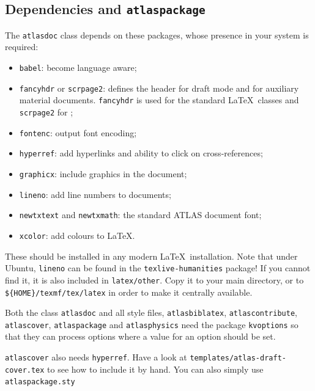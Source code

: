 \documentclass[UKenglish]{latex/atlasdoc}
\newcommand{\File}[1]{\texttt{#1}\xspace}
\newcommand{\Package}[1]{\texttt{#1}\xspace}
\begin{document}
\subsection{Dependencies and \Package{atlaspackage}}
\label{sec:atlaspackage}

The \Package{atlasdoc} class depends on these packages, whose presence in
your system is required:
\begin{itemize}\setlength{\parskip}{0pt}\setlength{\itemsep}{0pt}
\item \Package{babel}: become language aware;
\item \Package{fancyhdr} or \Package{scrpage2}: defines the header for draft mode
  and for auxiliary material documents.
  \Package{fancyhdr} is used for the standard \LaTeX\ classes and
  \Package{scrpage2} for \KOMAScript;
\item \Package{fontenc}: output font encoding;
\item \Package{hyperref}: add hyperlinks and ability to click on cross-references;
\item \Package{graphicx}: include graphics in the document;
\item \Package{lineno}: add line numbers to documents;
\item \Package{newtxtext} and \Package{newtxmath}: the standard ATLAS document font;
\item \Package{xcolor}: add colours to \LaTeX.
\end{itemize}
These should be installed in any modern \LaTeX\ installation.
Note that under Ubuntu, \Package{lineno} can be found in the
\Package{texlive-humanities} package!
If you cannot find it, it is also included in \File{latex/other}.
Copy it to your main directory, or to \verb|${HOME}/texmf/tex/latex| in order to make
it centrally available.

Both the class \Package{atlasdoc} and all style files, 
\Package{atlasbiblatex}, \Package{atlascontribute}, \Package{atlascover}, \Package{atlaspackage} and \Package{atlasphysics}
need the package \Package{kvoptions} 
so that they can process options where a value for an option should be set.

\texttt{atlascover} also needs \texttt{hyperref}. 
Have a look at \texttt{templates/atlas-draft-cover.tex} to see how to include it by hand.
You can also simply use \texttt{atlaspackage.sty}
\end{document}
